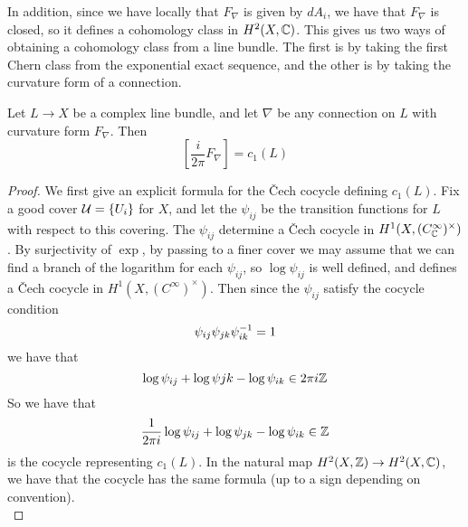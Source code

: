 %
In addition, since we have locally that $F_\nabla$ is given by $dA_i$, we have that
$F_\nabla$ is closed, so it defines a cohomology class in $H^2(X,\mathbb{C})$. This gives us
two ways of obtaining a cohomology class from a line bundle. The first is by taking
the first Chern class from the exponential exact sequence, and the other is
by taking the curvature form of a connection.
%
\begin{thm}
Let $L \to X$ be a complex line bundle, and let $\nabla$ be any connection on $L$ with
curvature form $F_\nabla$. Then
\[
\left[\frac{i}{2\pi}F_\nabla\right] = c_1(L)
\]
\end{thm}
%
\begin{proof}
We first give an explicit formula for the \v{C}ech cocycle defining $c_1(L)$.
Fix a good cover $\mathcal{U} = \left\lbrace U_i \right\rbrace$ for $X$, and let the $\psi_{ij}$ be the
transition functions for $L$ with respect to this covering. The $\psi_{ij}$
determine a \v{C}ech cocycle in $H^1(X, (C^\infty_{\mathbb{C}})^\times)$. By surjectivity of
$\exp$, by passing to a finer cover we may assume that we can find a branch of the
logarithm for each $\psi_{ij}$, so $\log\psi_{ij}$ is well defined, and defines a
\v{C}ech cocycle in $H^1(X, (C^\infty)^\times)$. Then since
the $\psi_{ij}$ satisfy the cocycle condition
\[
\psi_{ij}\psi_{jk}\psi_{ik}^{-1} = 1
\]
we have that
\[
\log\psi_{ij} + \log\psi{jk} - \log\psi_{ik} \in 2\pi i\mathbb{Z}
\]
So we have that
\[
\frac{1}{2\pi i}\log\psi_{ij} + \log\psi_{jk} - \log\psi_{ik} \in \mathbb{Z}
\]
is the cocycle representing $c_1(L)$. In the natural map
$H^2(X,\mathbb{Z}) \to H^2(X,\mathbb{C})$, we have that the cocycle has the same formula (up to a sign
depending on convention). \\


\end{proof}
